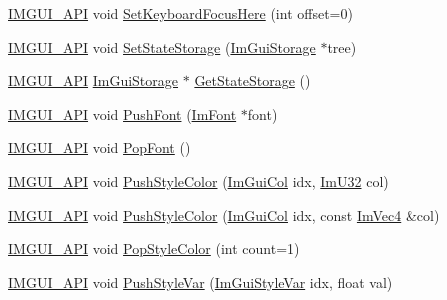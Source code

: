 \begin{DoxyCompactItemize}
\item 
\mbox{\hyperlink{imgui_8h_a43829975e84e45d1149597467a14bbf5}{I\+M\+G\+U\+I\+\_\+\+A\+PI}} void \mbox{\hyperlink{namespace_im_gui_ae85e5fba7e88cea8bd3ba5b687c979f2}{Set\+Keyboard\+Focus\+Here}} (int offset=0)
\item 
\mbox{\hyperlink{imgui_8h_a43829975e84e45d1149597467a14bbf5}{I\+M\+G\+U\+I\+\_\+\+A\+PI}} void \mbox{\hyperlink{namespace_im_gui_a635f4511603cc6284d8b21fb8d53090d}{Set\+State\+Storage}} (\mbox{\hyperlink{struct_im_gui_storage}{Im\+Gui\+Storage}} $\ast$tree)
\item 
\mbox{\hyperlink{imgui_8h_a43829975e84e45d1149597467a14bbf5}{I\+M\+G\+U\+I\+\_\+\+A\+PI}} \mbox{\hyperlink{struct_im_gui_storage}{Im\+Gui\+Storage}} $\ast$ \mbox{\hyperlink{namespace_im_gui_aa2b8fa1a5320cd70f23a53d8fe604fb2}{Get\+State\+Storage}} ()
\item 
\mbox{\hyperlink{imgui_8h_a43829975e84e45d1149597467a14bbf5}{I\+M\+G\+U\+I\+\_\+\+A\+PI}} void \mbox{\hyperlink{namespace_im_gui_ac5a59f4f8226fd35786d8973c85b85a9}{Push\+Font}} (\mbox{\hyperlink{struct_im_font}{Im\+Font}} $\ast$font)
\item 
\mbox{\hyperlink{imgui_8h_a43829975e84e45d1149597467a14bbf5}{I\+M\+G\+U\+I\+\_\+\+A\+PI}} void \mbox{\hyperlink{namespace_im_gui_af66649bc37022bf3cf2496c73af9a499}{Pop\+Font}} ()
\item 
\mbox{\hyperlink{imgui_8h_a43829975e84e45d1149597467a14bbf5}{I\+M\+G\+U\+I\+\_\+\+A\+PI}} void \mbox{\hyperlink{namespace_im_gui_a77ee84afb636e05eb4b2d6eeddcc2aa8}{Push\+Style\+Color}} (\mbox{\hyperlink{imgui_8h_a1b0467ec582e731ae6292fef726fb5fe}{Im\+Gui\+Col}} idx, \mbox{\hyperlink{imgui_8h_a118cff4eeb8d00e7d07ce3d6460eed36}{Im\+U32}} col)
\item 
\mbox{\hyperlink{imgui_8h_a43829975e84e45d1149597467a14bbf5}{I\+M\+G\+U\+I\+\_\+\+A\+PI}} void \mbox{\hyperlink{namespace_im_gui_a5bd052ebf55015312a53739974950e7b}{Push\+Style\+Color}} (\mbox{\hyperlink{imgui_8h_a1b0467ec582e731ae6292fef726fb5fe}{Im\+Gui\+Col}} idx, const \mbox{\hyperlink{struct_im_vec4}{Im\+Vec4}} \&col)
\item 
\mbox{\hyperlink{imgui_8h_a43829975e84e45d1149597467a14bbf5}{I\+M\+G\+U\+I\+\_\+\+A\+PI}} void \mbox{\hyperlink{namespace_im_gui_a9795f730b4043a98b6254738d86efcdc}{Pop\+Style\+Color}} (int count=1)
\item 
\mbox{\hyperlink{imgui_8h_a43829975e84e45d1149597467a14bbf5}{I\+M\+G\+U\+I\+\_\+\+A\+PI}} void \mbox{\hyperlink{namespace_im_gui_aab3f43009094462cf2a5eb554785949b}{Push\+Style\+Var}} (\mbox{\hyperlink{imgui_8h_ac919acabce24faae590e295b424874ca}{Im\+Gui\+Style\+Var}} idx, float val)

\end{DoxyCompactItemize}
